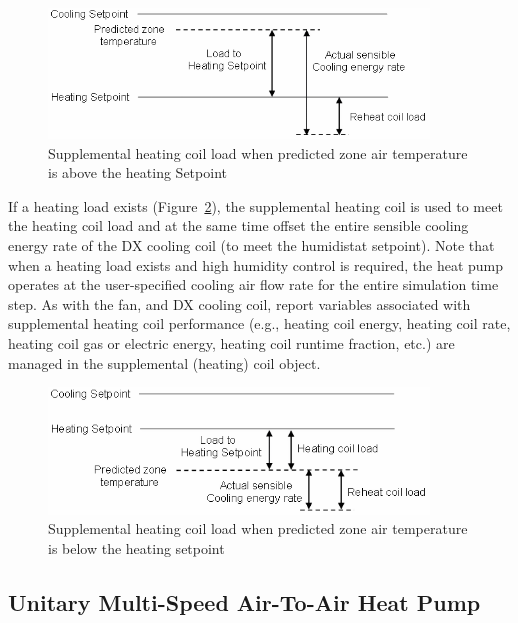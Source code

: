 \begin{figure}[hbtp] %
\centering
\includegraphics[width=0.9\textwidth, height=0.9\textheight, keepaspectratio=true]{media/image5145.png}
\caption{Supplemental heating coil load when predicted zone air temperature is above the heating Setpoint \protect \label{fig:supplemental-heating-coil-load-when-predicted-002}}
\end{figure}

If a heating load exists (Figure~\ref{fig:supplemental-heating-coil-load-when-predicted-003}), the supplemental heating coil is used to meet the heating coil load and at the same time offset the entire sensible cooling energy rate of the DX cooling coil (to meet the humidistat setpoint). Note that when a heating load exists and high humidity control is required, the heat pump operates at the user-specified cooling air flow rate for the entire simulation time step. As with the fan, and DX cooling coil, report variables associated with supplemental heating coil performance (e.g., heating coil energy, heating coil rate, heating coil gas or electric energy, heating coil runtime fraction, etc.) are managed in the supplemental (heating) coil object.

\begin{figure}[hbtp] %
\centering
\includegraphics[width=0.9\textwidth, height=0.9\textheight, keepaspectratio=true]{media/image5146.png}
\caption{Supplemental heating coil load when predicted zone air temperature is below the heating setpoint \protect \label{fig:supplemental-heating-coil-load-when-predicted-003}}
\end{figure}

\subsection{Unitary Multi-Speed Air-To-Air Heat Pump}\label{unitary-multi-speed-air-to-air-heat-pump}

